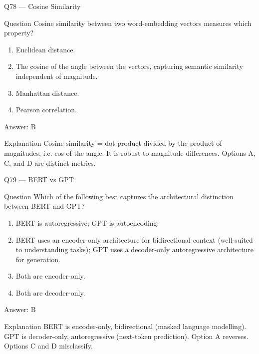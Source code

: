 \documentclass[aspectratio=169,8pt]{beamer}
\begin{document}
	\begin{frame}{Q78 --- Cosine Similarity}
		\begin{block}{Question}
			Cosine similarity between two word-embedding vectors measures which property?
		\end{block}
		\begin{enumerate}
			\item Euclidean distance.
			\item The cosine of the angle between the vectors, capturing semantic similarity independent of magnitude.
			\item Manhattan distance.
			\item Pearson correlation.
		\end{enumerate}
		\begin{exampleblock}{Answer: B}\end{exampleblock}
		\begin{block}{Explanation}
			Cosine similarity = dot product divided by the product of magnitudes, i.e. cos of the angle. It is robust to magnitude differences. Options A, C, and D are distinct metrics.
		\end{block}
	\end{frame}
	
	\begin{frame}{Q79 --- BERT vs GPT}
		\begin{block}{Question}
			Which of the following best captures the architectural distinction between BERT and GPT?
		\end{block}
		\begin{enumerate}
			\item BERT is autoregressive; GPT is autoencoding.
			\item BERT uses an encoder-only architecture for bidirectional context (well-suited to understanding tasks); GPT uses a decoder-only autoregressive architecture for generation.
			\item Both are encoder-only.
			\item Both are decoder-only.
		\end{enumerate}
		\begin{exampleblock}{Answer: B}\end{exampleblock}
		\begin{block}{Explanation}
			BERT is encoder-only, bidirectional (masked language modelling). GPT is decoder-only, autoregressive (next-token prediction). Option A reverses. Options C and D misclassify.
		\end{block}
	\end{frame}
	
\end{document}
